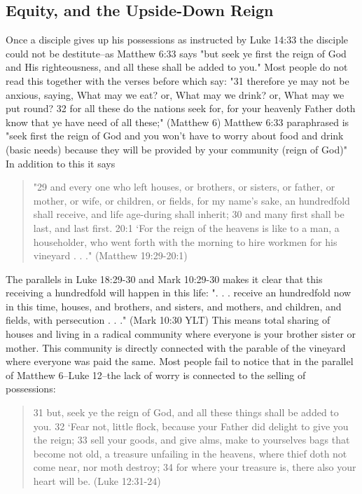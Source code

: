 \documentclass[11pt]{article}
\begin{document}
\subsection{Equity, and the Upside-Down Reign}
Once a disciple gives up his possessions as instructed by Luke 14:33 the disciple could not be destitute--as Matthew 6:33 says "but seek ye first the reign of God and His righteousness, and all these shall be added to you." Most people do not read this together with the verses before which say: "31 therefore ye may not be anxious, saying, What may we eat? or, What may we drink? or, What may we put round? 32 for all these do the nations seek for, for your heavenly Father doth know that ye have need of all these;" (Matthew 6) Matthew 6:33 paraphrased is "seek first the reign of God and you won't have to worry about food and drink (basic needs) because they will be provided by your community (reign of God)" In addition to this it says 
\begin{quote}
"29 and every one who left houses, or brothers, or sisters, or father, or mother, or wife, or children, or fields, for my name's sake, an hundredfold shall receive, and life age-during shall inherit; 30 and many first shall be last, and last first. 20:1 `For the reign of the heavens is like to a man, a householder, who went forth with the morning to hire workmen for his vineyard . . ." (Matthew 19:29-20:1)
\end{quote}
The parallels in Luke 18:29-30 and Mark 10:29-30 makes it clear that this receiving a hundredfold will happen in this life: ". . . receive an hundredfold now in this time, houses, and brothers, and sisters, and mothers, and children, and fields, with persecution . . ." (Mark 10:30 YLT) This means total sharing of houses and living in a radical community where everyone is your brother sister or mother. This community is directly connected with the parable of the vineyard where everyone was paid the same. Most people fail to notice that in the parallel of Matthew 6--Luke 12--the lack of worry is connected to the selling of possessions:
\begin{quote}
31 but, seek ye the reign of God, and all these things shall be added to you.
32 `Fear not, little flock, because your Father did delight to give you the reign;
33 sell your goods, and give alms, make to yourselves bags that become not old, a treasure unfailing in the heavens, where thief doth not come near, nor moth destroy;
34 for where your treasure is, there also your heart will be. (Luke 12:31-24)
\end{quote}
\end{document}
